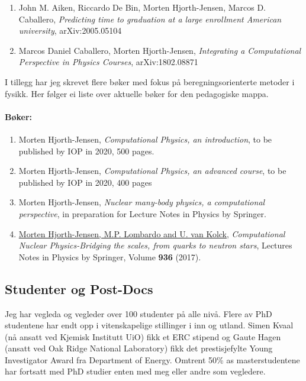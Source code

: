 \documentclass[aps,floatfix,preprint]{revtex4-1}
\begin{document}
\begin{enumerate}
\item John M. Aiken, Riccardo De Bin, Morten Hjorth-Jensen, Marcos D. Caballero, \emph{Predicting time to graduation at a large enrollment American university}, arXiv:2005.05104 

\item Marcos Daniel Caballero, Morten Hjorth-Jensen, \emph{Integrating a Computational Perspective in Physics Courses}, arXiv:1802.08871

\end{enumerate}


I tillegg har jeg skrevet flere bøker med fokus på
beregningsorienterte metoder i fysikk. Her følger ei liste over
aktuelle bøker for den pedagogiske mappa.

\paragraph*{Bøker:}
\begin{enumerate}
\item Morten Hjorth-Jensen, \emph{Computational Physics, an introduction}, to be published by IOP in 2020, 500 pages.

\item Morten Hjorth-Jensen, \emph{Computational Physics, an advanced course}, to be published by IOP in 2020, 400 pages

\item Morten Hjorth-Jensen, \emph{Nuclear many-body physics, a computational perspective}, in preparation for Lecture Notes in Physics by Springer.

\item \href{{http://www.springer.com/us/book/9783319533353}}{Morten Hjorth-Jensen, M.P. Lombardo and U. van Kolck}, \emph{Computational Nuclear Physics-Bridging the scales, from quarks to neutron stars}, Lectures Notes in Physics by Springer, Volume \textbf{936} (2017).
\end{enumerate}




\subsection*{Studenter og Post-Docs}

Jeg har vegleda og vegleder over 100 studenter på alle nivå. Flere av
PhD studentene har endt opp i vitenskapelige stillinger i inn og
utland. Simen Kvaal (nå ansatt ved Kjemisk Institutt UiO) fikk et ERC
stipend og Gaute Hagen (ansatt ved Oak Ridge National Laboratory) fikk
det prestisjefylte Young Investigator Award fra Department of
Energy. Omtrent 50\% as masterstudentene har fortsatt med PhD studier enten med meg eller andre som vegledere.
\end{document}

